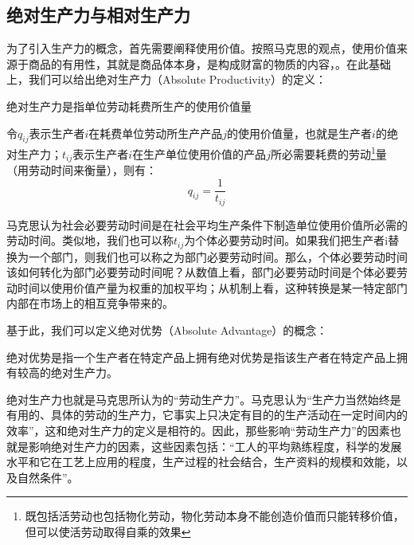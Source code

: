 \subsection{绝对生产力与相对生产力}

为了引入生产力的概念，首先需要阐释使用价值。按照马克思的观点，使用价值来源于商品的有用性，其就是商品体本身，是构成财富的物质的内容，\cite[48-49]{ZhongGongZhongYangMaKeSiEnGeSiLieNingSiDaLinZhuZuoBianYiJuMaKeSiEnGeSiWenJiDi5Juan2009}。在此基础上，我们可以给出绝对生产力（Absolute Productivity）的定义：

\begin{definition}
    绝对生产力是指单位劳动耗费所生产的使用价值量\cite[47]{CaiJiMingCongXiaYiJieZhiLunDaoGuangYiJieZhiLunXiuDingBan2022}
\end{definition}

令$q_{ij}$表示生产者$i$在耗费单位劳动所生产产品$j$的使用价值量，也就是生产者$i$的绝对生产力；$t_{ij}$表示生产者$i$在生产单位使用价值的产品$j$所必需要耗费的劳动\footnote{既包括活劳动也包括物化劳动，物化劳动本身不能创造价值而只能转移价值，但可以使活劳动取得自乘的效果\cite{ChengEnFuXinDeHuoLaoDongJieZhiYiYuanLunLaoDongJieZhiLiLunDeDangDaiTuoZhan2001}}量（用劳动时间来衡量\cite[51]{ZhongGongZhongYangMaKeSiEnGeSiLieNingSiDaLinZhuZuoBianYiJuMaKeSiEnGeSiWenJiDi5Juan2009}），则有：
\begin{equation}
    \label{jueduishengchanli}
    q_{ij}=\frac{1}{t_{ij}}
\end{equation}

马克思认为社会必要劳动时间是在社会平均生产条件下制造单位使用价值所必需的劳动时间\cite[52]{ZhongGongZhongYangMaKeSiEnGeSiLieNingSiDaLinZhuZuoBianYiJuMaKeSiEnGeSiWenJiDi5Juan2009}。类似地，我们也可以称$t_{ij}$为个体必要劳动时间。如果我们把生产者i替换为一个部门，则我们也可以称之为部门必要劳动时间。那么，个体必要劳动时间该如何转化为部门必要劳动时间呢？从数值上看，部门必要劳动时间是个体必要劳动时间以使用价值产量为权重的加权平均\cite[53]{LinGangGuanYuSheHuiBiYaoLaoDongShiJianYiJiLaoDongShengChanLuYuJieZhiLiangGuanXiWenTiDeTanTao2005}；从机制上看，这种转换是某一特定部门内部在市场上的相互竞争带来的。

基于此，我们可以定义绝对优势（Absolute Advantage）的概念：

\begin{definition}
    绝对优势是指一个生产者在特定产品上拥有绝对优势是指该生产者在特定产品上拥有较高的绝对生产力。
\end{definition}

绝对生产力也就是马克思所认为的“劳动生产力”。马克思认为“生产力当然始终是有用的、具体的劳动的生产力，它事实上只决定有目的的生产活动在一定时间内的效率”\cite[59]{ZhongGongZhongYangMaKeSiEnGeSiLieNingSiDaLinZhuZuoBianYiJuMaKeSiEnGeSiWenJiDi5Juan2009}，这和绝对生产力的定义是相符的。因此，那些影响“劳动生产力”的因素也就是影响绝对生产力的因素，这些因素包括：“工人的平均熟练程度，科学的发展水平和它在工艺上应用的程度，生产过程的社会结合，生产资料的规模和效能，以及自然条件”\cite[53]{ZhongGongZhongYangMaKeSiEnGeSiLieNingSiDaLinZhuZuoBianYiJuMaKeSiEnGeSiWenJiDi5Juan2009}。

